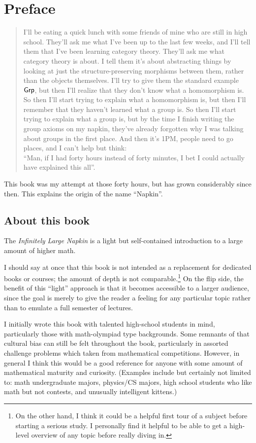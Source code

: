 \chapter*{Preface}

\begin{quote}
\small
I'll be eating a quick lunch with some friends of mine
who are still in high school.
They'll ask me what I've been up to the last few weeks,
and I'll tell them that I've been learning category theory.
They'll ask me what category theory is about.
I tell them it's about abstracting things by looking at just the
structure-preserving morphisms between them, rather than the objects themselves.
I'll try to give them the standard example $\mathsf{Grp}$,
but then I'll realize that they don't know what a homomorphism is.
So then I'll start trying to explain what a homomorphism is,
but then I'll remember that they haven't learned what a group is.
So then I'll start trying to explain what a group is,
but by the time I finish writing the group axioms on my napkin,
they've already forgotten why I was talking about groups in the first place.
And then it's 1PM, people need to go places, and I can't help but think: \\
``Man, if I had forty hours instead of forty minutes,
I bet I could actually have explained this all''.
\end{quote}
This book was my attempt at those forty hours,
but has grown considerably since then.
This explains the origin of the name ``Napkin''.

\section*{About this book}
The \emph{Infinitely Large Napkin} is a light
but self-contained introduction to a large
amount of higher math.

I should say at once that this book is not intended
as a replacement for dedicated books or courses;
the amount of depth is not comparable.\footnote{On the other hand,
	I think it could be a helpful first tour of a subject
	before starting a serious study.
	I personally find it helpful to be able to get
	a high-level overview of any topic before really diving in.}
On the flip side, the benefit of this ``light'' approach
is that it becomes accessible to a larger audience,
since the goal is merely to give the reader a feeling for
any particular topic rather than to emulate a full semester of lectures.

I initially wrote this book with talented high-school students in mind,
particularly those with math-olympiad type backgrounds.
Some remnants of that cultural bias can still be felt throughout the book,
particularly in assorted challenge problems which
taken from mathematical competitions.
However, in general I think this would be a good reference
for anyone with some amount of mathematical maturity and curiosity.
(Examples include but certainly not limited to:
math undergraduate majors, physics/CS majors,
high school students who like math but not contests,
and unusually intelligent kittens.)

